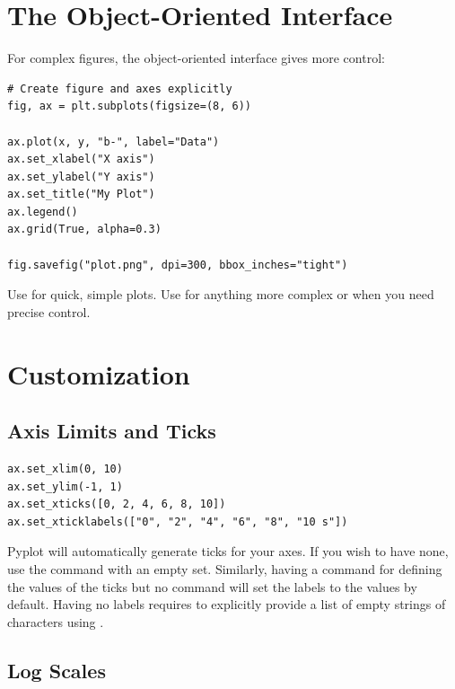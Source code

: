 \section{The Object-Oriented Interface}
\label{sec:oo-interface}

For complex figures, the object-oriented interface gives more control:

\begin{lstlisting}
# Create figure and axes explicitly
fig, ax = plt.subplots(figsize=(8, 6))

ax.plot(x, y, "b-", label="Data")
ax.set_xlabel("X axis")
ax.set_ylabel("Y axis")
ax.set_title("My Plot")
ax.legend()
ax.grid(True, alpha=0.3)

fig.savefig("plot.png", dpi=300, bbox_inches="tight")
\end{lstlisting}

\begin{tip}
Use  for quick, simple plots. Use  for anything more complex or when you need precise control.
\end{tip}

\section{Customization}
\label{sec:customization}

\subsection{Axis Limits and Ticks}

\begin{lstlisting}
ax.set_xlim(0, 10)
ax.set_ylim(-1, 1)
ax.set_xticks([0, 2, 4, 6, 8, 10])
ax.set_xticklabels(["0", "2", "4", "6", "8", "10 s"])
\end{lstlisting}

\begin{tip}
Pyplot will automatically generate ticks for your axes. If you wish to have none, use the  command with an empty set.\n
Similarly, having a  command for defining the values of the ticks but no  command will set the labels to the values by default. Having no labels requires to explicitly provide a list of empty strings of characters using .
\end{tip}

\subsection{Log Scales}

